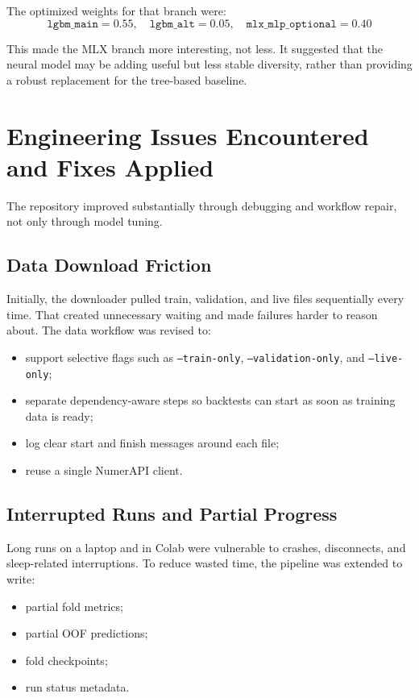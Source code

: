 \documentclass[11pt]{article}
\begin{document}
The optimized weights for that branch were:
\[
\texttt{lgbm\_main} = 0.55, \quad
\texttt{lgbm\_alt} = 0.05, \quad
\texttt{mlx\_mlp\_optional} = 0.40
\]

This made the MLX branch more interesting, not less. It suggested that the neural model may be adding useful but less stable diversity, rather than providing a robust replacement for the tree-based baseline.

\section{Engineering Issues Encountered and Fixes Applied}

The repository improved substantially through debugging and workflow repair, not only through model tuning.

\subsection{Data Download Friction}

Initially, the downloader pulled train, validation, and live files sequentially every time. That created unnecessary waiting and made failures harder to reason about. The data workflow was revised to:

\begin{itemize}[leftmargin=1.5em]
  \item support selective flags such as \texttt{--train-only}, \texttt{--validation-only}, and \texttt{--live-only};
  \item separate dependency-aware steps so backtests can start as soon as training data is ready;
  \item log clear start and finish messages around each file;
  \item reuse a single NumerAPI client.
\end{itemize}

\subsection{Interrupted Runs and Partial Progress}

Long runs on a laptop and in Colab were vulnerable to crashes, disconnects, and sleep-related interruptions. To reduce wasted time, the pipeline was extended to write:

\begin{itemize}[leftmargin=1.5em]
  \item partial fold metrics;
  \item partial OOF predictions;
  \item fold checkpoints;
  \item run status metadata.
\end{itemize}
\end{document}
